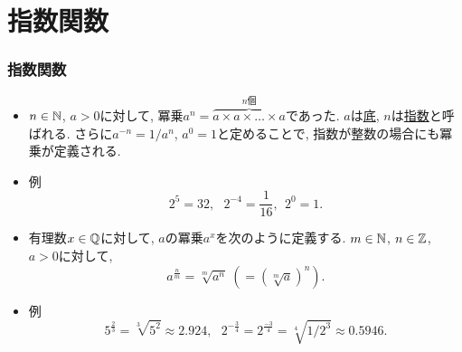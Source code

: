
\section{指数関数}


\begin{frame}
\frametitle{指数関数}

\begin{itemize}
\item  $n\in \mathbb{N}$, $a >0$に対して, 冪乗$a^n =\overbrace{ a \times a \times \dots \times a}^\text{$n$個}$であった. 
$a$は\underline{底}, $n$は\underline{指数}と呼ばれる. 
さらに$a^{-n}=1/a^n$, $a^0=1$と定めることで, 指数が整数の場合にも冪乗が定義される. 
\item 例
$$
2^5=32, \ \ \ 2^{-4}=\frac{1}{16}, \ \ 2^0=1. 
$$
\item 有理数$x \in \mathbb{Q}$に対して, $a$の冪乗$a^x$を次のように定義する. 
$m \in \mathbb{N}$, $n\in \mathbb{Z}$, $a>0$に対して, 
$$
a^{\frac{n}{m}}=\sqrt[m]{a^n} \ (=(\sqrt[m]{a})^n). 
$$
\item 例
$$
5^{\frac{2}{3}}=\sqrt[3]{5^2} \approx 2.924,  \ \ \ 2^{-\frac{3}{4}}=2^{\frac{-3}{4}}=\sqrt[4]{1/2^3} \approx 0.5946.  
$$
\end{itemize}



\end{frame}






